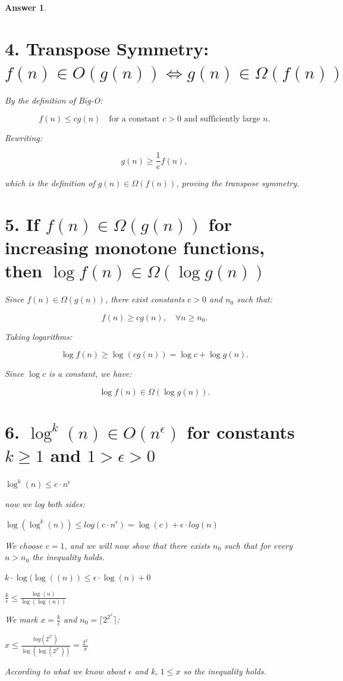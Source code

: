 \documentclass[a4paper]{article}
\theoremstyle{remarksStyle}
\theoremstyle{questionStyle}
\theoremstyle{answerStyle}
\newtheorem{answer}{Answer}
\begin{document}
\begin{answer}
\section*{4. Transpose Symmetry: \( f(n) \in O(g(n)) \iff g(n) \in \Omega(f(n)) \)}

By the definition of Big-O:

\[
f(n) \leq c g(n) \quad \text{for a constant } c > 0 \text{ and sufficiently large } n.
\]

Rewriting:

\[
g(n) \geq \frac{1}{c} f(n),
\]

which is the definition of \( g(n) \in \Omega(f(n)) \), proving the transpose symmetry. 

\section*{5. If \( f(n) \in \Omega(g(n)) \) for increasing monotone functions, then \( \log f(n) \in \Omega(\log g(n)) \)}

Since \( f(n) \in \Omega(g(n)) \), there exist constants \( c > 0 \) and \( n_0 \) such that:

\[
f(n) \geq c g(n), \quad \forall n \geq n_0.
\]

Taking logarithms:

\[
\log f(n) \geq \log (c g(n)) = \log c + \log g(n).
\]

Since \( \log c \) is a constant, we have:

\[
\log f(n) \in \Omega(\log g(n)).
\]

\section*{6. \( \log^k(n) \in O(n^\epsilon) \) for constants \( k \geq 1 \) and \( 1 > \epsilon > 0 \) }

\item \begin{center} $\log^k(n) \leq c \cdot n ^\epsilon$ \end{center}
now we log both sides: 
\begin{center}
$\log(\log^k(n)) \leq log(c \cdot n^ \epsilon) = \log(c) + \epsilon \cdot 
log(n)$ \end{center}
We choose $ c = 1$, and we will now show that there exists $n_0$ such
that for every $n > n_0$ the inequality holds. 
\begin{center} 
\item $k \cdot \log(\log((n)) \leq \epsilon \cdot \log(n) + 0$ 
\item $\frac{k}{\epsilon} \leq \frac{\log(n)}{\log(\log(n))}$
\end{center}
We mark $x = \frac{k}{\epsilon}$ and $n_0 = \lceil 2^{2^x} \rceil$:
\begin{center} 
\item $x \leq \frac{log(2^{2^x})}{\log(\log(2^{2^x}))} = \frac{2^x}{x}$ 
\end{center}
According to what we know about $\epsilon$ and k, $ 1 \leq x$ so the inequality holds.




\end{answer}
\end{document}
